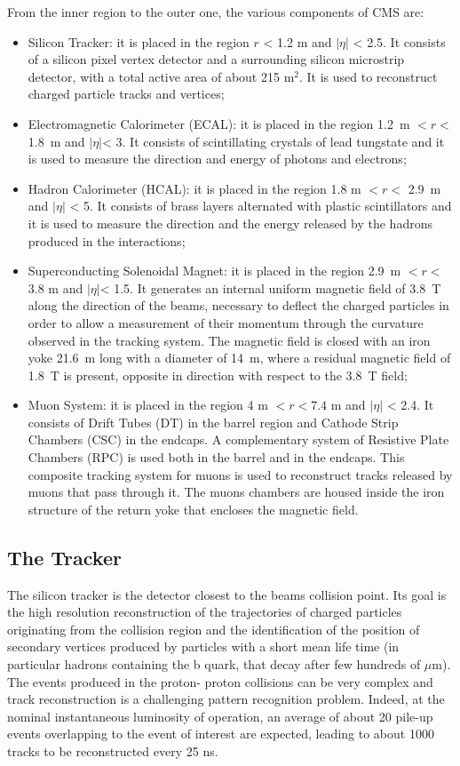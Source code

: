 From the inner region to the outer one, the various components of CMS are:
\begin{itemize}
\item Silicon Tracker: it is placed in the region $r$ < 1.2 m and $|\eta|$ < 2.5. It consists of
a silicon pixel vertex detector and a surrounding silicon microstrip detector, with a
total active area of about 215 m$^2$. It is used to reconstruct charged particle tracks
and vertices;
\item Electromagnetic Calorimeter (ECAL): it is placed in the region 1.2~m $< r <$
1.8~m and $|\eta|$< 3. It consists of scintillating crystals of lead
tungstate  and it is used to measure the direction and energy of photons and electrons;
\item Hadron Calorimeter (HCAL): it is placed in the region 1.8 m $< r <$ 2.9~m and
$|\eta|$ < 5. It consists of brass layers alternated with plastic scintillators and it is used
to measure the direction and the energy released by the hadrons produced in the
interactions;
\item Superconducting Solenoidal Magnet: it is placed in the region 2.9~m $< r <$
3.8 m and  $|\eta|$< 1.5. It generates an internal uniform magnetic field of 3.8~T along
the direction of the beams, necessary to deflect the charged particles in order to
allow a measurement of their momentum through the curvature observed in the
tracking system. The magnetic field is closed with an iron yoke 21.6~m long with a
diameter of 14~m, where a residual magnetic field of 1.8~T is present, opposite
in direction with respect to the 3.8~T field;
\item Muon System: it is placed in the region 4 m $< r < 7.4$ m and $|\eta|$ < 2.4. It consists
of Drift Tubes (DT) in the barrel region and Cathode Strip Chambers (CSC) in the
endcaps. A complementary system of Resistive Plate Chambers (RPC) is used both
in the barrel and in the endcaps. This composite tracking system for muons is used
to reconstruct tracks released by muons that pass through it. The muons chambers
are housed inside the iron structure of the return yoke that encloses the magnetic
field.
\end{itemize}

\subsection*{The Tracker}
The silicon tracker is the detector closest to the beams collision point. Its goal is
the high resolution reconstruction of the trajectories of charged particles originating
from the collision region and the identification of the position of secondary vertices
produced by particles with a short mean life time (in particular hadrons containing the
b quark, that decay after few hundreds of $\mu$m). The events produced in the proton-
proton collisions can be very complex and track reconstruction is a
challenging pattern
recognition problem. Indeed, at the nominal instantaneous luminosity of operation,
an average of about 20 pile-up events overlapping to the event of interest are expected,
leading to about 1000 tracks to be reconstructed every 25 ns.


